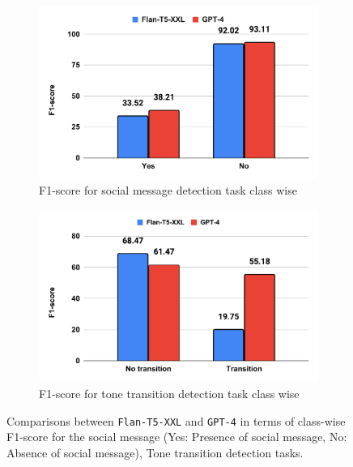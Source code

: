 \begin{figure}[h!]
\begin{subfigure}{.50\textwidth}
  \centering
  \includegraphics[width=\linewidth]{figures/gpt_4_flan_t5_xxl_social_message.pdf}
  \caption{F1-score for social message detection task class wise}
  \label{class_wise_social_message}
\end{subfigure}%
\begin{subfigure}{.50\textwidth}
  \centering
  \includegraphics[width=\linewidth]{figures/gpt_4_flan_t5_xxl_transition.pdf}
  \caption{F1-score for tone transition detection task class wise}
  \label{class_wise_tone_transition}
\end{subfigure}
\caption{Comparisons between \texttt{Flan-T5-XXL} and \texttt{GPT-4} in terms of class-wise F1-score for the social message (Yes: Presence of social message, No: Absence of social message), Tone transition detection tasks.}
\label{tone_transition_social_message}
\end{figure}

